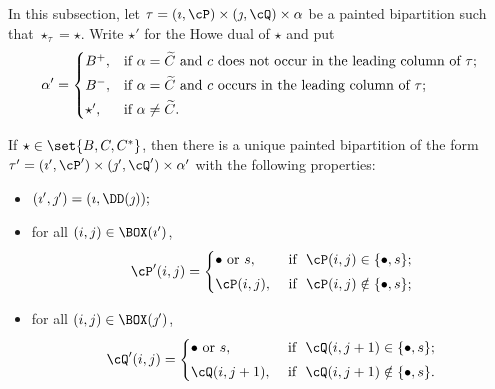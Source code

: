 \documentclass[ssunip]{subfiles}
\begin{document}
In this subsection, let $\tau=(\imath,\cP)\times (\jmath,\cQ)\times \alpha$ be a  painted bipartition such that $\star_\tau=\star$. Write $\star'$ for the Howe dual of $\star$ and put
  \begin{equation} \label{eq:def.alphap}
    \alpha'=\begin{cases} B^+,
  & \textrm{if $\alpha=\widetilde{C}$ and $c$ does not occur in the leading column of $\tau$}; \smallskip \\
  B^-,
  & \textrm{if $\alpha=\widetilde{C}$ and  $c$ occurs in the leading column of $\tau$}; \smallskip \\
  \star', & \textrm{if $\alpha\neq \widetilde C$}. 
  \end{cases}
  \end{equation}
\begin{lem}\label{lemDDn1}
  If $\star \in \set{B,C,C^*}$, then there is a unique painted bipartition of the form $\tau'= (\imath',\cP')\times (\jmath',\cQ')\times \alpha'$ with the following properties:
  \begin{itemize}
        \item $
   (\imath',\jmath')= (\imath,\DD(\jmath)); \smallskip
   $
   \item for all $(i,j)\in \BOX(\imath')$,
   \[
     \cP'(i,j)=\begin{cases}   
    \bullet \textrm{ or } s,&\textrm{ if  $\ \cP(i,j)\in \{\bullet, s\}$;} \smallskip \\
  \cP(i,j),& \textrm{ if $\ \cP(i,j)\notin \{\bullet, s\}$};\end{cases}
   \]
   \item for all $(i,j)\in \BOX(\jmath')$,
   \[
     \cQ'(i,j)=\begin{cases}   
    \bullet \textrm{ or } s,&\textrm{ if  $\ \cQ(i,j+1)\in \{\bullet, s\}$;} \smallskip \\
  \cQ(i,j+1), & \textrm{ if $\ \cQ(i,j+1)\notin \{\bullet, s\}$}.  \end{cases}
   \]
    \end{itemize} 
    \end{lem}
    
    
\end{document}
